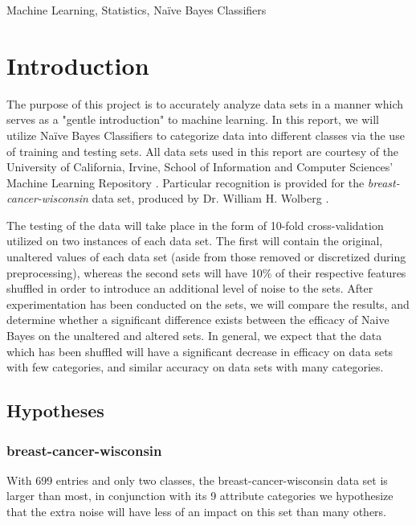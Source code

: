 \documentclass[twoside,11pt]{article}
\begin{document}
	\begin{keywords}
		Machine Learning, Statistics, Naïve Bayes Classifiers
	\end{keywords}
	
	\section{Introduction}\label{sec:introduction}
	
	The purpose of this project is to accurately analyze data sets in a manner which serves as a "gentle introduction" to machine learning. In this report, we will utilize Naïve Bayes Classifiers to categorize data into different classes via the use of training and testing sets. All data sets used in this report are courtesy of the University of California, Irvine, School of Information and Computer Sciences' Machine Learning Repository \citep{Dua:2019}. Particular recognition is provided for the \textit{breast-cancer-wisconsin} data set, produced by Dr. William H. Wolberg \citep{ARTICLE:1, WEBSITE:1}.
	
	The testing of the data will take place in the form of 10-fold cross-validation utilized on two instances of each data set. The first will contain the original, unaltered values of each data set (aside from those removed or discretized during preprocessing), whereas the second sets will have 10\% of their respective features shuffled in order to introduce an additional level of noise to the sets. After experimentation has been conducted on the sets, we will compare the results, and determine whether a significant difference exists between the efficacy of Naive Bayes on the unaltered and altered sets. In general, we expect that the data which has been shuffled will have a significant decrease in efficacy on data sets with few categories, and similar accuracy on data sets with many categories.
	
	\subsection{Hypotheses}\label{subsec:hypotheses}
	\subsubsection{breast-cancer-wisconsin}\label{subsubsec:breast-cancer-wisconsin}
	With 699 entries and only two classes, the breast-cancer-wisconsin data set is larger than most, in conjunction with its 9 attribute categories we hypothesize that the extra noise will have less of an impact on this set than many others.
	
\end{document}
